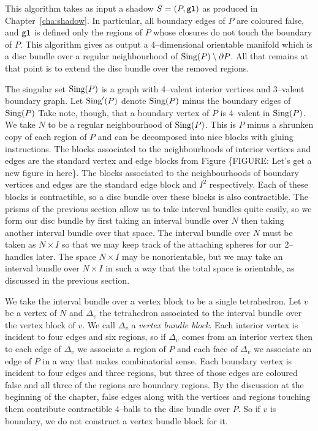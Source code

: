 \label{alg:handlebody}

This algorithm takes as input a shadow $S=(P,\texttt{gl})$ as produced in Chapter~\ref{cha:shadow}.
In particular, all boundary edges of $P$ are coloured false, and $\texttt{gl}$ is defined only the regions of $P$ whose closures do not touch the boundary of $P$.
This algorithm gives as output a 4--dimensional orientable manifold which is a disc bundle over a regular neighbourhood of $\textrm{Sing} (P)\setminus\partial P$.
All that remains at that point is to extend the disc bundle over the removed regions.

The singular set $\textrm{Sing} (P)$ is a graph with 4--valent interior vertices and 3--valent boundary graph.
Let $\textrm{Sing}'(P)$ denote $\textrm{Sing}(P)$ minus the boundary edges of $\textrm{Sing}(P)$
Take note, though, that a boundary vertex of $P$ is 4--valent in $\textrm{Sing} (P)$.
We take $N$ to be a regular neighbourhood of $\textrm{Sing}(P)$.
This is $P$ minus a shrunken copy of each region of $P$ and can be decomposed into nice blocks with gluing instructions.
The blocks associated to the neighbourhoods of interior vertices and edges are the standard vertex and edge blocks from Figure \{FIGURE: Let's get a new figure in here\}.
The blocks associated to the neighbourhoods of boundary vertices and edges are the standard edge block and $I^2$ respectively.
Each of these blocks is contractible, so a disc bundle over these blocks is also contractible.
The prisms of the previous section allow us to take interval bundles quite easily, so we form our disc bundle by first taking an interval bundle over $N$ then taking another interval bundle over that space.
The interval bundle over $N$ must be taken as $N\times I$ so that we may keep track of the attaching spheres for our 2--handles later.
The space $N\times I$ may be nonorientable, but we may take an interval bundle over $N\times I$ in such a way that the total space is orientable, as discussed in the previous section.
 

We take the interval bundle over a vertex block to be a single tetrahedron.
Let $v$ be a vertex of $N$ and $\Delta_v$ the tetrahedron associated to the interval bundle over the vertex block of $v$.
We call $\Delta_v$ a \emph{vertex bundle block}.
Each interior vertex is incident to four edges and six regions, so if $\Delta_v$ comes from an interior vertex then to each edge of $\Delta_v$ we associate a region of $P$ and each face of $\Delta_v$ we associate an edge of $P$ in a way that makes combinatorial sense.
Each boundary vertex is incident to four edges and three regions, but three of those edges are coloured false and all three of the regions are boundary regions.
By the discussion at the beginning of the chapter, false edges along with the vertices and regions touching them contribute contractible 4--balls to the disc bundle over $P$.
So if $v$ is boundary, we do not construct a vertex bundle block for it.

